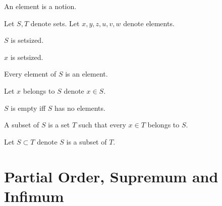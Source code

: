 \documentclass{article}
\begin{document}
  \begin{forthel}

    \begin{signature}
      An element is a notion.
    \end{signature}

    Let $S,T$ denote sets.
    Let $x,y,z,u,v,w$ denote elements.

    \begin{axiom}
      $S$ is setsized.
    \end{axiom}

    \begin{axiom}
      $x$ is setsized.
    \end{axiom}

    \begin{axiom}
      Every element of $S$ is an element.
    \end{axiom}

    Let $x$ belongs to $S$ denote $x \in S$.

    \begin{definition}[DefEmpty]
      $S$ is empty iff $S$ has no elements.
    \end{definition}

    \begin{definition}[DefSub]
      A subset of $S$ is a set $T$ such that every $x \in T$ belongs to $S$.
    \end{definition}

    Let $S \subset T$ denote $S$ is a subset of $T$.
  \end{forthel}

  \section{Partial Order, Supremum and Infimum}
\end{document}
